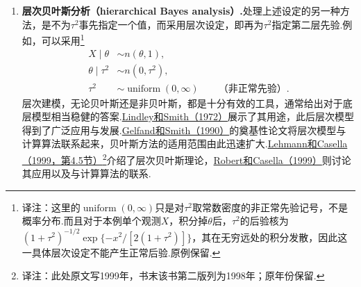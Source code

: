 \begin{enumerate}[label=\arabic*.]
\item \textbf{层次贝叶斯分析（hierarchical Bayes analysis）.}处理上述设定的另一种方法，是不为$\tau^2$事先指定一个值，而采用层次设定，即再为$\tau^2$指定第二层先验.例如，可以采用\footnote{译注：这里的$\operatorname{uniform}(0,\infty)$只是对$\tau^2$取常数密度的非正常先验记号，不是概率分布.而且对于本例单个观测$X$，积分掉$\theta$后，$\tau^2$的后验核为$(1+\tau^2)^{-1/2}\exp\{-x^2/[2(1+\tau^2)]\}$，其在无穷远处的积分发散，因此这一具体层次设定不能产生正常后验.原例保留.}
$$\begin{aligned}X\mid\theta&\sim n(\theta,1),\\\theta\mid\tau^2&\sim n(0,\tau^2),\\\tau^2&\sim\operatorname{uniform}(0,\infty)\qquad\text{（非正常先验）}.\end{aligned}$$
层次建模，无论贝叶斯还是非贝叶斯，都是十分有效的工具，通常给出对于底层模型相当稳健的答案.\hyperref[bib:source207]{Lindley和Smith（1972）}展示了其用途，此后层次模型得到了广泛应用与发展.\hyperref[bib:source134]{Gelfand和Smith（1990）}的奠基性论文将层次模型与计算算法联系起来，贝叶斯方法的适用范围由此迅速扩大.\hyperref[bib:source200]{Lehmann和Casella（1999，第4.5节）}\footnote{译注：此处原文写1999年，书末该书第二版列为1998年；原年份保留.}介绍了层次贝叶斯理论，\hyperref[bib:source256]{Robert和Casella（1999）}则讨论其应用以及与计算算法的联系.
\end{enumerate}
